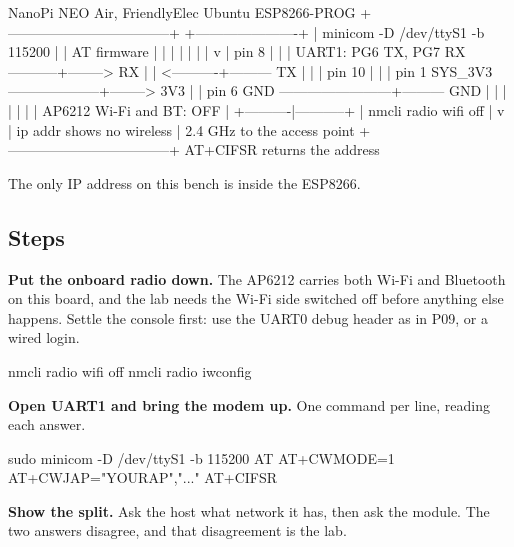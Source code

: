 \begin{asciiart}
  NanoPi NEO Air, FriendlyElec Ubuntu          ESP8266-PROG
  +-----------------------------------+        +----------------------+
  | minicom -D /dev/ttyS1 -b 115200   |        | AT firmware          |
  |        |                          |        |                      |
  |        v                          | pin 8  |                      |
  | UART1: PG6 TX, PG7 RX  -----------+--------> RX                   |
  |                        <----------+--------- TX                   |
  |                                   | pin 10 |                      |
  | pin 1 SYS_3V3 --------------------+--------> 3V3                  |
  | pin 6 GND ------------------------+--------- GND                  |
  |                                   |        |          |           |
  | AP6212 Wi-Fi and BT: OFF          |        +----------|-----------+
  | nmcli radio wifi off              |                   v
  | ip addr shows no wireless         |          2.4 GHz to the access point
  +-----------------------------------+          AT+CIFSR returns the address

  The only IP address on this bench is inside the ESP8266.
\end{asciiart}

\subsection*{Steps}

\begin{steps}
\item \textbf{Put the onboard radio down.} The AP6212 carries both Wi-Fi and Bluetooth on this board, and the lab needs the Wi-Fi side switched off before anything else happens. Settle the console first: use the UART0 debug header as in P09, or a wired login.
\begin{shellcode}
nmcli radio wifi off
nmcli radio
iwconfig
\end{shellcode}

\item \textbf{Open UART1 and bring the modem up.} One command per line, reading each answer.
\begin{atcode}
sudo minicom -D /dev/ttyS1 -b 115200
AT
AT+CWMODE=1
AT+CWJAP="YOURAP","..."
AT+CIFSR
\end{atcode}

\item \textbf{Show the split.} Ask the host what network it has, then ask the module. The two answers disagree, and that disagreement is the lab.
\end{steps}

